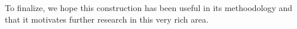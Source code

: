 To finalize, we hope this construction has been useful in its methoodology and that it motivates further research in this very rich area.


%




